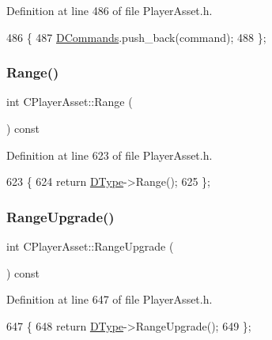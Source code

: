 Definition at line 486 of file Player\+Asset.\+h.


\begin{DoxyCode}
486                                                       \{
487             \hyperlink{classCPlayerAsset_a4d3b96106d3b1c1020f98005884d2a87}{DCommands}.push\_back(command);
488         \};
\end{DoxyCode}
\hypertarget{classCPlayerAsset_a717695212dd7159bd0b6e97d4ae5cf9b}{}\label{classCPlayerAsset_a717695212dd7159bd0b6e97d4ae5cf9b} 
\subsubsection{\texorpdfstring{Range()}{Range()}}
{\footnotesize\ttfamily int C\+Player\+Asset\+::\+Range (\begin{DoxyParamCaption}{ }\end{DoxyParamCaption}) const\hspace{0.3cm}{\ttfamily [inline]}}



Definition at line 623 of file Player\+Asset.\+h.


\begin{DoxyCode}
623                          \{
624             \textcolor{keywordflow}{return} \hyperlink{classCPlayerAsset_a5d61f73471e1e6f0a6ab15f2ffa7b359}{DType}->Range(); 
625         \};
\end{DoxyCode}
\hypertarget{classCPlayerAsset_aad35da7eb13a1d5830471a0f6de5090e}{}\label{classCPlayerAsset_aad35da7eb13a1d5830471a0f6de5090e} 
\subsubsection{\texorpdfstring{Range\+Upgrade()}{RangeUpgrade()}}
{\footnotesize\ttfamily int C\+Player\+Asset\+::\+Range\+Upgrade (\begin{DoxyParamCaption}{ }\end{DoxyParamCaption}) const\hspace{0.3cm}{\ttfamily [inline]}}



Definition at line 647 of file Player\+Asset.\+h.


\begin{DoxyCode}
647                                 \{
648             \textcolor{keywordflow}{return} \hyperlink{classCPlayerAsset_a5d61f73471e1e6f0a6ab15f2ffa7b359}{DType}->RangeUpgrade();
649         \};
\end{DoxyCode}
\hypertarget{classCPlayerAsset_a0c696a50d23ee7fb3fcfbf7e696c739f}{}\label{classCPlayerAsset_a0c696a50d23ee7fb3fcfbf7e696c739f} 
